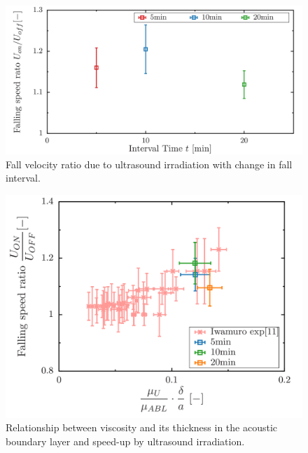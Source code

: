 \begin{figure}[ht]
    \begin{center}
        \includegraphics[width=13cm,clip]{5-Discussion/diff.png}
        \caption{Fall velocity ratio due to ultrasound irradiation with change in fall interval.}
        \label{fig:speed-diff}
    \end{center}
\end{figure}

\begin{figure}[ht]
    \begin{center}
        \includegraphics[width=13cm,clip]{5-Discussion/diff-iwamuro.png}
        \caption{Relationship between viscosity and its thickness in the acoustic boundary layer and speed-up by ultrasound irradiation.}
        \label{fig:speed-diff-iwamuro}
    \end{center}
\end{figure}